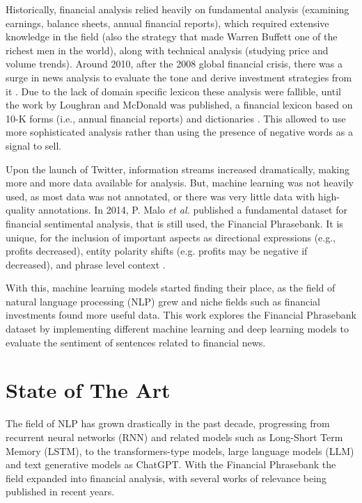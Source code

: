 \documentclass[conference]{IEEEtran}
\begin{document}
Historically, financial analysis relied heavily on fundamental analysis (examining earnings, balance sheets, annual financial reports), which required extensive knowledge in the field (also the strategy that made Warren Buffett one of the richest men in the world), along with technical analysis (studying price and volume trends). Around 2010, after the 2008 global financial crisis, there was a surge in news analysis to evaluate the tone and derive investment strategies from it \cite{tetlock2007giving}. Due to the lack of domain specific lexicon these analysis were fallible, until the work by Loughran and McDonald was published, a financial lexicon based on 10-K forms (i.e., annual financial reports) and dictionaries \cite{loughran2011liability}. This allowed to use more sophisticated analysis rather than using the presence of negative words as a signal to sell.

Upon the launch of Twitter, information streams increased dramatically, making more and more data available for analysis. But, machine learning was not heavily used, as most data was not annotated, or there was very little data with high-quality annotations. In 2014, P. Malo \textit{et al.} published a fundamental dataset for financial sentimental analysis, that is still used, the Financial Phrasebank. It is unique, for the inclusion of important aspects as directional expressions (e.g., profits decreased), entity polarity shifts (e.g. profits may be negative if decreased), and phrase level context \cite{malo2014good}.

With this, machine learning models started finding their place, as the field of natural language processing (NLP) grew and niche fields such as financial investments found more useful data. This work explores the Financial Phrasebank dataset by implementing different machine learning and deep learning models to evaluate the sentiment of sentences related to financial news.

\section{State of The Art}

The field of NLP has grown drastically in the past decade, progressing from recurrent neural networks (RNN) and related models such as Long-Short Term Memory (LSTM), to the transformers-type models, large language models (LLM) and text generative models as ChatGPT. With the Financial Phrasebank the field expanded into financial analysis, with several works of relevance being published in recent years.
\end{document}
